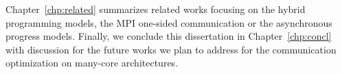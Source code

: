 Chapter~\ref{chp:related} summarizes related works focusing on the
hybrid programming models, the MPI one-sided communication or the asynchronous
progress models. Finally, we conclude this dissertation in Chapter~\ref{chp:concl}
with discussion for the future works we plan to address for the communication
optimization on many-core architectures.
